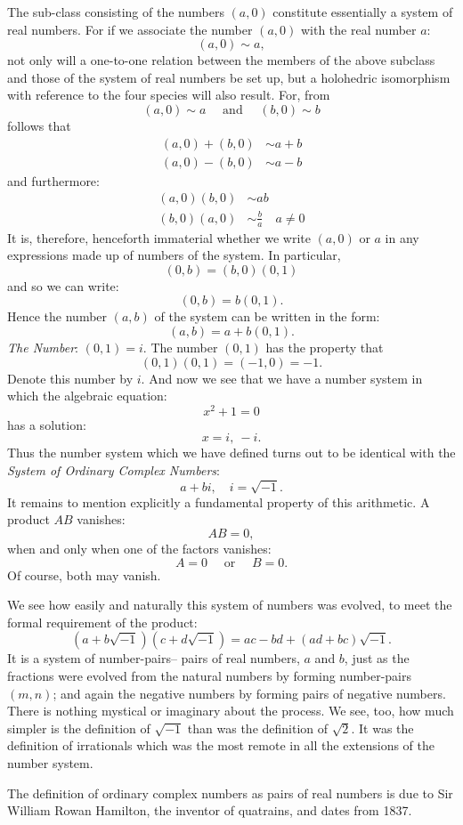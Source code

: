 \documentclass[letter,oneside]{memoir}
\begin{document}
The sub-class consisting of the numbers $(a,0)$ constitute essentially a system of real numbers. For if we associate the number $(a,0)$ with the real number $a$:
\[
	(a,0) \sim a
,\]  not only will a one-to-one relation between the members of the above subclass and those of the system of real numbers be set up, but a holohedric isomorphism with reference to the four species will also result. For, from
\[
	(a,0) \sim a \quad \text{ and } \quad (b,0) \sim b
\] follows that
\begin{align*}
	(a,0)+(b,0) &\sim a+b\\
	(a,0) - (b,0) &\sim a-b
\end{align*} and furthermore:
\begin{align*}
	(a,0)(b,0) &\sim ab\\
	(b,0)(a,0) &\sim \frac{b}{a} \quad a\neq 0
\end{align*} It is, therefore, henceforth immaterial whether we write $(a,0)$ or $a$ in any expressions made up of numbers of the system. In particular, 
\[
	(0,b)=(b,0)(0,1)
\] and so we can write:
\[
	(0,b)=b(0,1)
.\] Hence the number $(a,b)$ of the system can be written in the form:
\[
	(a,b)=a+b(0,1)
.\] \emph{The Number}: $(0,1)=i$. The number $(0,1)$ has the property that
\[
	(0,1)(0,1)=(-1,0)=-1
.\] Denote this number by $i$. And now we see that we have a number system in which the algebraic equation:
\[
x^2+1=0
\] has a solution:
\[
x=i,\: -i
.\] Thus the number system which we have defined turns out to be identical with the \emph{System of Ordinary Complex Numbers}:
\[
a+bi, \quad i=\sqrt{-1} 
.\] It remains to mention explicitly a fundamental property of this arithmetic. A product $AB$ vanishes:
\[
AB=0
,\] when and only when one of the factors vanishes:
\[
A=0 \quad \text{ or } \quad B=0
.\] Of course, both may vanish.

We see how easily and naturally this system of numbers was evolved, to meet the formal requirement of the product:
\[
	(a+b\sqrt{-1} )(c+d\sqrt{-1} )=ac-bd+(ad+bc)\sqrt{-1} 
.\] It is a system of number-pairs-- pairs of real numbers, $a$ and $b$, just as the fractions were evolved from the natural numbers by forming number-pairs $(m,n)$; and again the negative numbers by forming pairs of negative numbers. There is nothing mystical or imaginary about the process. We see, too, how much simpler is the definition of $\sqrt{-1} $ than was the definition of $\sqrt{2} $. It was the definition of irrationals which was the most remote in all the extensions of the number system. 

The definition of ordinary complex numbers as pairs of real numbers is due to Sir William Rowan Hamilton, the inventor of quatrains, and dates from 1837.
\end{document}
